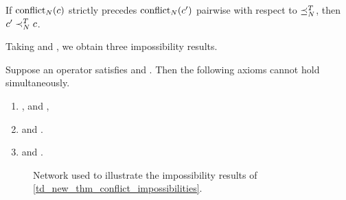 \begin{axiom}[\conflictcoherence{}]
    If $\operatorname{conflict}_N(c)$ strictly precedes $\operatorname{conflict}_N(c')$ pairwise with
    respect to $\preceq_N^T$, then $c' \prec_N^T c$.
\end{axiom}

Taking \symmetry{} and \claimcoherence{}, we obtain three impossibility
results.

\begin{theorem}
    \label{td_new_thm_conflict_impossibilities}
    Suppose an operator satisfies \symmetry{} and \claimcoherence{}. Then the
    following axioms cannot hold simultaneously.
    \begin{enumerate}
        \item \freshposresp{}, \sourcecoherence{} and \conflictcoherence{},
        \item \sourceposresp{} and \conflictcoherence{}.
        \item \sourceposresp{} and \anticoherence{}.
    \end{enumerate}
\end{theorem}

\begin{figure}
    \centering
    \caption{
        Network used to illustrate the impossibility results of
        \cref{td_new_thm_conflict_impossibilities}.
    }
    \label{td_new_fig_conflict_impossibilities}
\end{figure}

